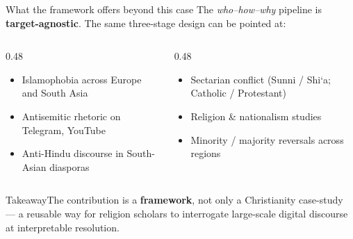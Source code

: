 \documentclass[aspectratio=169,10pt]{beamer}
\newcommand{\keyword}[1]{\textcolor{uzhblue}{\textbf{#1}}}
\newcommand{\takeaway}[1]{%
  \vspace{0.3em}
  \begin{block}{Takeaway}#1\end{block}}
\begin{document}
\begin{frame}{What the framework offers beyond this case}
  \small
  The \emph{who--how--why} pipeline is \keyword{target-agnostic}.
  The same three-stage design can be pointed at:
  \vspace{0.3em}
  \begin{columns}[T,onlytextwidth]
    \begin{column}{0.48\textwidth}
    \begin{itemize}
      \item Islamophobia across Europe and South Asia
      \item Antisemitic rhetoric on Telegram, YouTube
      \item Anti-Hindu discourse in South-Asian diasporas
    \end{itemize}
    \end{column}
    \begin{column}{0.48\textwidth}
    \begin{itemize}
      \item Sectarian conflict (Sunni / Shi`a; Catholic / Protestant)
      \item Religion \& nationalism studies
      \item Minority / majority reversals across regions
    \end{itemize}
    \end{column}
  \end{columns}
  \vspace{0.4em}
  \takeaway{The contribution is a \keyword{framework}, not only a
  Christianity case-study — a reusable way for religion scholars to
  interrogate large-scale digital discourse at interpretable
  resolution.}
\end{frame}
\end{document}
